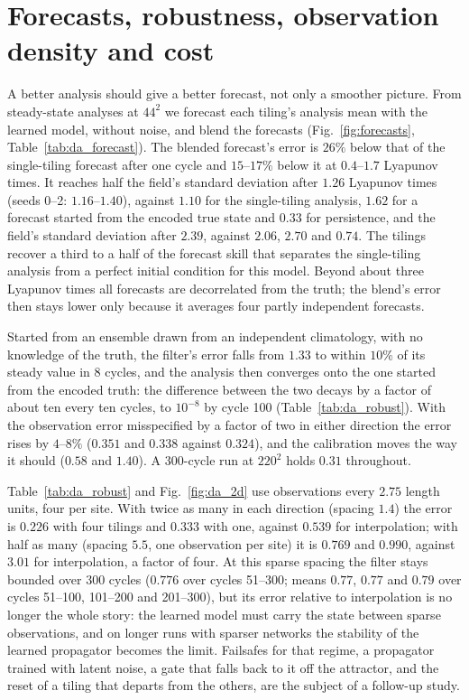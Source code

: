 \section{Forecasts, robustness, observation density and cost}
\label{sec:da_robust}

 A better analysis should give a better
forecast, not only a smoother picture. From steady-state analyses at
$44^2$ we forecast each tiling's analysis mean with the learned model,
without noise, and blend the forecasts (Fig.~\ref{fig:forecasts},
Table~\ref{tab:da_forecast}). The blended forecast's error is $26\%$ below
that of the single-tiling forecast after one cycle and $15$--$17\%$ below it
at $0.4$--$1.7$ Lyapunov times. It reaches half the field's standard
deviation after $1.26$ Lyapunov times (seeds 0--2: $1.16$--$1.40$), against $1.10$ for
the single-tiling analysis, $1.62$ for a forecast started from the encoded
true state and $0.33$ for persistence, and the field's standard deviation
after $2.39$, against $2.06$, $2.70$ and $0.74$. The tilings recover a third to a half
of the forecast skill that separates the single-tiling analysis from a
perfect initial condition for this model. Beyond about three Lyapunov
times all forecasts are decorrelated from the truth; the blend's error
then stays lower only because it averages four partly independent
forecasts.

 Started from an ensemble drawn from an independent
climatology, with no knowledge of the truth, the filter's error falls
from $1.33$ to within $10\%$ of its steady value in 8 cycles, and the analysis
then converges onto the one started from the encoded truth: the
difference between the two decays by a factor of about ten every ten
cycles, to $10^{-8}$ by cycle 100 (Table~\ref{tab:da_robust}). With the
observation error misspecified by a factor of two in either direction
the error rises by $4$--$8\%$ ($0.351$ and $0.338$ against $0.324$), and the calibration
moves the way it should ($0.58$ and $1.40$). A 300-cycle run at $220^2$ holds $0.31$ throughout.

 Table~\ref{tab:da_robust} and Fig.~\ref{fig:da_2d}
use observations every $2.75$ length units, four per site. With twice as
many in each direction (spacing $1.4$) the error is $0.226$ with four tilings and
$0.333$ with one, against $0.539$ for interpolation; with half as many (spacing
$5.5$, one observation per site) it is $0.769$ and $0.990$, against $3.01$ for
interpolation, a factor of four. At this sparse spacing the filter stays
bounded over 300 cycles ($0.776$ over cycles 51--300; means $0.77$, $0.77$ and $0.79$ over cycles 51--100,
101--200 and 201--300), but its error relative to interpolation is no
longer the whole story: the learned model must carry the state between
sparse observations, and on longer runs with sparser networks the
stability of the learned propagator becomes the limit. Failsafes for that
regime, a propagator trained with latent noise, a gate that falls back to
it off the attractor, and the reset of a tiling that departs from the
others, are the subject of a follow-up study.

